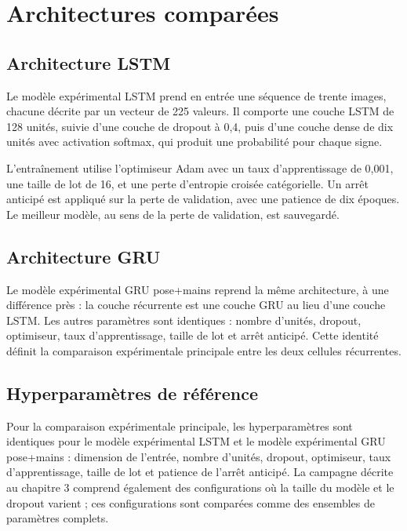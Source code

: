 \section{Architectures comparées}

\subsection{Architecture LSTM}

Le modèle expérimental LSTM prend en entrée une séquence de trente images, chacune décrite par un vecteur de 225 valeurs. Il comporte une couche LSTM de 128 unités, suivie d'une couche de dropout à 0,4, puis d'une couche dense de dix unités avec activation softmax, qui produit une probabilité pour chaque signe.

L'entraînement utilise l'optimiseur Adam avec un taux d'apprentissage de 0,001, une taille de lot de 16, et une perte d'entropie croisée catégorielle. Un arrêt anticipé est appliqué sur la perte de validation, avec une patience de dix époques. Le meilleur modèle, au sens de la perte de validation, est sauvegardé.

\subsection{Architecture GRU}

Le modèle expérimental GRU pose+mains reprend la même architecture, à une différence près : la couche récurrente est une couche GRU au lieu d'une couche LSTM. Les autres paramètres sont identiques : nombre d'unités, dropout, optimiseur, taux d'apprentissage, taille de lot et arrêt anticipé. Cette identité définit la comparaison expérimentale principale entre les deux cellules récurrentes.

\subsection{Hyperparamètres de référence}

Pour la comparaison expérimentale principale, les hyperparamètres sont identiques pour le modèle expérimental LSTM et le modèle expérimental GRU pose+mains : dimension de l'entrée, nombre d'unités, dropout, optimiseur, taux d'apprentissage, taille de lot et patience de l'arrêt anticipé. La campagne décrite au chapitre 3 comprend également des configurations où la taille du modèle et le dropout varient ; ces configurations sont comparées comme des ensembles de paramètres complets.

